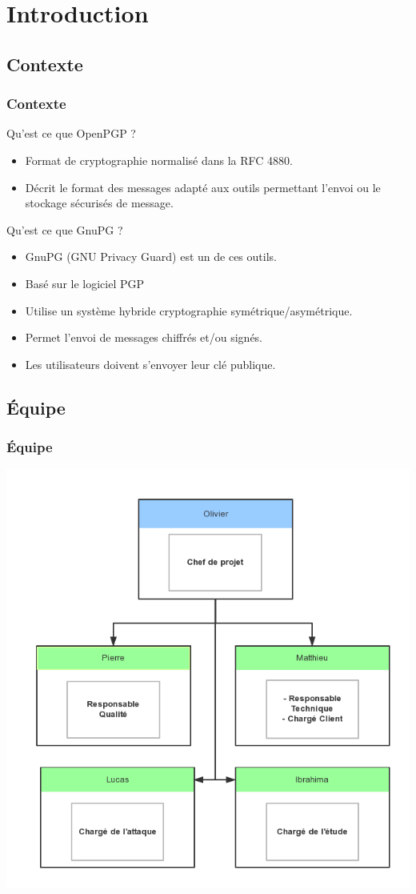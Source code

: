\section{Introduction}
\subsection{Contexte}
\begin{frame}
    \frametitle{\color{white}Contexte}
    \begin{block}{Qu'est ce que OpenPGP ?}
    	\begin{itemize}
         \item Format de cryptographie normalisé dans la RFC 4880.
         \item Décrit le format des messages adapté aux outils permettant l’envoi ou le stockage sécurisés de message.
       \end{itemize} 
    \end{block}
    \begin{block}{Qu'est ce que GnuPG ?}
      \begin{itemize}
        \item GnuPG (GNU Privacy Guard) est un de ces outils.
        \item Basé sur le logiciel PGP 
        \item Utilise un système hybride cryptographie symétrique/asymétrique.
        \item Permet l'envoi de messages chiffrés et/ou signés.
        \item Les utilisateurs doivent s'envoyer leur clé publique.
      \end{itemize}
    \end{block}
\end{frame}

\subsection{Équipe}
\begin{frame}
    \frametitle{\color{white}Équipe}
  \begin{center}
    \includegraphics[scale=0.30]{guipgteam.png}
  \end{center}
\end{frame}
